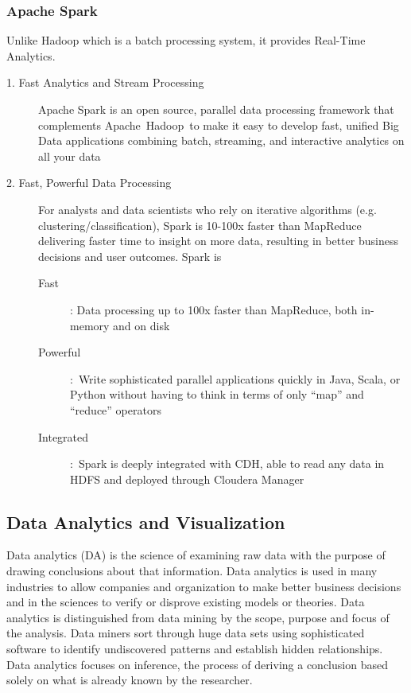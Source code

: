 \subsubsection{Apache Spark}
Unlike Hadoop which is a batch processing system, it provides Real-Time Analytics.
\begin{description}
\item[1. Fast Analytics and Stream Processing] Apache Spark is an open source, parallel data processing framework that complements Apache Hadoop to make it easy to develop fast, unified Big Data applications combining batch, streaming, and interactive analytics on all your data

\item[2. Fast, Powerful Data Processing] For analysts and data scientists who rely on iterative algorithms (e.g. clustering/classification), Spark is 10-100x faster than MapReduce delivering faster time to insight on more data, resulting in better business decisions and user outcomes. Spark is 
\begin{description}
\item[Fast]: Data processing up to 100x faster than MapReduce, both in-memory and on disk
\item[Powerful]: Write sophisticated parallel applications quickly in Java, Scala, or Python without having to think in terms of only “map” and “reduce” operators
\item[Integrated]: Spark is deeply integrated with CDH, able to read any data in HDFS and deployed through Cloudera Manager
\end{description}
\end{description}

\subsection{Data Analytics and Visualization}
Data analytics (DA) is the science of examining raw data with the purpose of drawing conclusions about that information. Data analytics is used in many industries to allow companies and organization to make better business decisions and in the sciences to verify or disprove existing models or theories. Data analytics is distinguished from data mining by the scope, purpose and focus of the analysis. Data miners sort through huge data sets using sophisticated software to identify undiscovered patterns and establish hidden relationships. Data analytics focuses on inference, the process of deriving a conclusion based solely on what is already known by the researcher.

